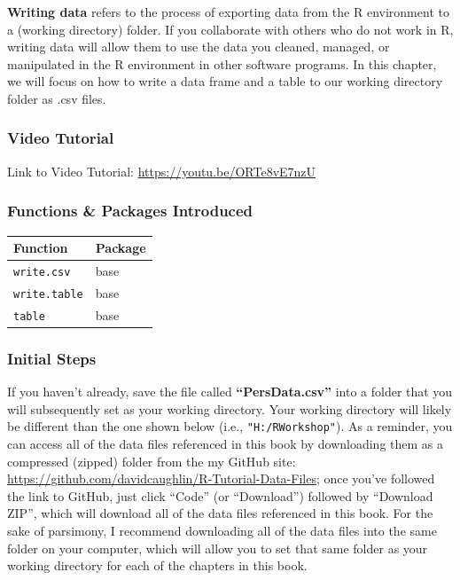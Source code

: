 \documentclass[]{book}
\begin{document}
\textbf{Writing data} refers to the process of exporting data from the R
environment to a (working directory) folder. If you collaborate with
others who do not work in R, writing data will allow them to use the
data you cleaned, managed, or manipulated in the R environment in other
software programs. In this chapter, we will focus on how to write a data
frame and a table to our working directory folder as .csv files.

\subsubsection{Video Tutorial}\label{video-tutorial}

Link to Video Tutorial: \url{https://youtu.be/ORTe8vE7nzU}

\subsubsection{Functions \& Packages
Introduced}\label{functions-packages-introduced}

\begin{longtable}[]{@{}ll@{}}
\toprule
Function & Package\tabularnewline
\midrule
\endhead
\texttt{write.csv} & base\tabularnewline
\texttt{write.table} & base\tabularnewline
\texttt{table} & base\tabularnewline
\bottomrule
\end{longtable}

\subsubsection{Initial Steps}\label{initial-steps}

If you haven't already, save the file called \textbf{``PersData.csv''}
into a folder that you will subsequently set as your working directory.
Your working directory will likely be different than the one shown below
(i.e., \texttt{"H:/RWorkshop"}). As a reminder, you can access all of
the data files referenced in this book by downloading them as a
compressed (zipped) folder from the my GitHub site:
\url{https://github.com/davidcaughlin/R-Tutorial-Data-Files}; once
you've followed the link to GitHub, just click ``Code'' (or
``Download'') followed by ``Download ZIP'', which will download all of
the data files referenced in this book. For the sake of parsimony, I
recommend downloading all of the data files into the same folder on your
computer, which will allow you to set that same folder as your working
directory for each of the chapters in this book.
\end{document}
